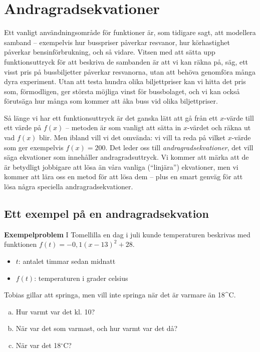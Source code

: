 \section{Andragradsekvationer}

Ett vanligt användningsområde för funktioner är, som tidigare sagt, att modellera samband -- exempelvis hur busspriser påverkar resvanor, hur körhastighet påverkar bensinförbrukning, och så vidare.
Vitsen med att sätta upp funktionsuttryck för att beskriva de sambanden är att vi kan räkna på, säg, ett visst pris på bussbiljetter påverkar resvanorna, utan att behöva genomföra många dyra experiment.
Utan att testa hundra olika biljettpriser kan vi hitta det pris som, förmodligen, ger största möjliga vinst för bussbolaget, och vi kan också förutsäga hur många som kommer att åka buss vid olika biljettpriser.

Så länge vi har ett funktionsuttryck är det ganska lätt att gå från ett $x$-värde till ett värde på $f(x)$ -- metoden är som vanligt att sätta in $x$-värdet och räkna ut vad $f(x)$ blir.
Men ibland vill vi det omvända: vi vill ta reda på vilket $x$-värde som ger exempelvis $f(x)=200$.
Det leder oss till \emph{andragradsekvationer}, det vill säga ekvationer som innehåller andragradsuttryck.
Vi kommer att märka att de är betydligt jobbigare att lösa än våra vanliga (``linjära'') ekvationer, men vi kommer att lära oss en metod för att lösa dem -- plus en smart genväg för att lösa några speciella andragradsekvationer.

\subsection{Ett exempel på en andragradsekvation}

\textbf{Exempelproblem}
I Tomellilla en dag i juli kunde temperaturen beskrivas med funktionen $f(t) = -0,1(x-13)^2+28$.
\begin{itemize}
  \item $t$: antalet timmar sedan midnatt
  \item $f(t)$: temperaturen i grader celsius
\end{itemize}

Tobias gillar att springa, men vill inte springa när det är varmare än 18^{\circ}C.

\begin{enumerate}[(a)]
  \item Hur varmt var det kl. 10?
  \item När var det som varmast, och hur varmt var det då?
  \item När var det 18$^{\circ}$C?
\end{enumerate}

